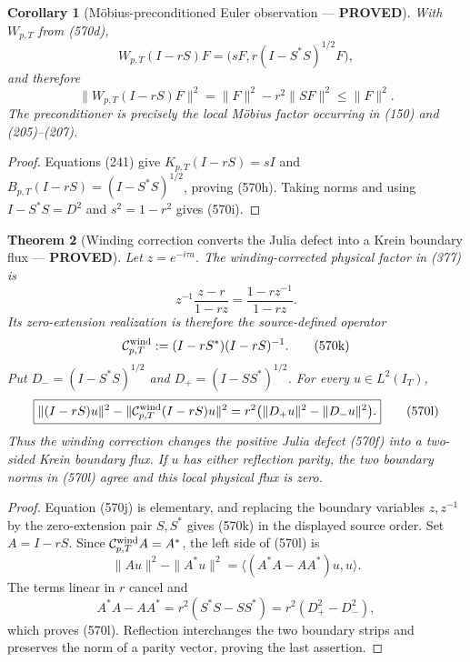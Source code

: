 \documentclass[11pt]{article}
\newtheorem{theorem}{Theorem}
\newtheorem{corollary}[theorem]{Corollary}
\newcommand{\PROVED}{\textcolor{green!45!black}{\textbf{PROVED}}}
\begin{document}
\begin{corollary}[M\"obius-preconditioned Euler observation --- \PROVED]
With \(W_{p,T}\) from (570d),
\begin{equation}
 W_{p,T}(I-rS)F
 =\bigl(sF,r(I-S^*S)^{1/2}F\bigr),                  \tag{570h}
\end{equation}
and therefore
\begin{equation}
 \|W_{p,T}(I-rS)F\|^2
 =\|F\|^2-r^2\|SF\|^2\le\|F\|^2.                   \tag{570i}
\end{equation}
The preconditioner is precisely the local M\"obius factor occurring in
(150) and (205)--(207).
\end{corollary}

\begin{proof}
Equations (241) give
\(K_{p,T}(I-rS)=sI\) and
\(B_{p,T}(I-rS)=(I-S^*S)^{1/2}\), proving (570h).
Taking norms and using
\(I-S^*S=D^2\) and \(s^2=1-r^2\) gives (570i).
\end{proof}

\begin{theorem}[Winding correction converts the Julia defect into a Krein
boundary flux --- \PROVED]
Let \(z=e^{-i\tau a}\).  The winding-corrected physical factor in
(377) is
\begin{equation}
 z^{-1}\frac{z-r}{1-rz}=\frac{1-rz^{-1}}{1-rz}.      \tag{570j}
\end{equation}
Its zero-extension realization is therefore the source-defined operator
\begin{equation}
 \mathcal C_{p,T}^{\rm wind}
 :=(I-rS^*)(I-rS)^{-1}.                              \tag{570k}
\end{equation}
Put \(D_-=(I-S^*S)^{1/2}\) and
\(D_+=(I-SS^*)^{1/2}\).  For every \(u\in L^2(I_T)\),
\begin{equation}
 \boxed{
 \|(I-rS)u\|^2-
 \|\mathcal C_{p,T}^{\rm wind}(I-rS)u\|^2
 =r^2\bigl(\|D_+u\|^2-\|D_-u\|^2\bigr).}            \tag{570l}
\end{equation}
Thus the winding correction changes the positive Julia defect (570f) into
a two-sided Krein boundary flux.  If \(u\) has either reflection parity,
the two boundary norms in (570l) agree and this local physical flux is zero.
\end{theorem}

\begin{proof}
Equation (570j) is elementary, and replacing the boundary variables
\(z,z^{-1}\) by the zero-extension pair \(S,S^*\) gives (570k) in the
displayed source order.  Set \(A=I-rS\).  Since
\(\mathcal C_{p,T}^{\rm wind}A=A^*\), the left side of (570l) is
\[
 \|Au\|^2-\|A^*u\|^2
 =\langle(A^*A-AA^*)u,u\rangle.
\]
The terms linear in \(r\) cancel and
\[
 A^*A-AA^*=r^2(S^*S-SS^*)=r^2(D_+^2-D_-^2),
\]
which proves (570l).  Reflection interchanges the two boundary strips and
preserves the norm of a parity vector, proving the last assertion.
\end{proof}
\end{document}
